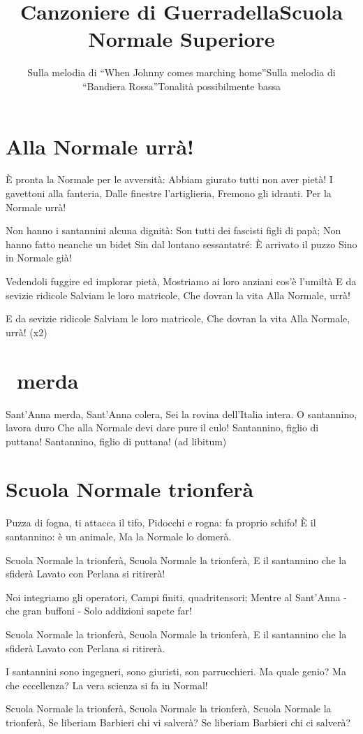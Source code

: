 \title{Canzoniere di Guerra}
\title{della}
\title{Scuola Normale Superiore}

\section{Alla Normale urrà!}
\subtitle{Sulla melodia di “When Johnny comes marching home”}
\begin{canzone}
È pronta la Normale per le avversità:
Abbiam giurato tutti non aver pietà!
I gavettoni alla fanteria,
Dalle finestre l’artiglieria,
Fremono gli idranti.
Per la Normale urrà!

Non hanno i santannini alcuna dignità:
Son tutti dei fascisti figli di papà;
Non hanno fatto neanche un bidet
Sin dal lontano sessantatré:
È arrivato il puzzo
Sino in Normale già!

Vedendoli fuggire ed implorar pietà,
Mostriamo ai loro anziani cos’è l’umiltà
E da sevizie ridicole
Salviam le loro matricole,
Che dovran la vita
Alla Normale, urrà! 

E da sevizie ridicole
Salviam le loro matricole,
Che dovran la vita
Alla Normale, urrà! (x2)
\end{canzone}

\section{\santanna\ merda}
\begin{canzone}
Sant’Anna merda, Sant’Anna colera,
Sei la rovina dell’Italia intera.
O santannino, lavora duro
Che alla Normale devi dare pure il culo!
Santannino, figlio di puttana!
Santannino, figlio di puttana! 
(ad libitum)
\end{canzone}

\section{Scuola Normale trionferà}
\subtitle{Sulla melodia di “Bandiera Rossa”}

\subtitle{Tonalità possibilmente bassa}
\begin{canzone}
Puzza di fogna, ti attacca il tifo,
Pidocchi e rogna: fa proprio schifo!
È il santannino: è un animale,
Ma la Normale lo domerà.

Scuola Normale la trionferà,
Scuola Normale la trionferà,
E il santannino che la sfiderà
Lavato con Perlana si ritirerà!

Noi integriamo gli operatori,
Campi finiti, quadritensori;
Mentre al Sant’Anna - che gran buffoni - 
Solo addizioni sapete far!

Scuola Normale la trionferà,
Scuola Normale la trionferà,
E il santannino che la sfiderà
Lavato con Perlana si ritirerà.

I santannini sono ingegneri,
sono giuristi, son parrucchieri.
Ma quale genio? Ma che eccellenza?
La vera scienza si fa in Normal!

Scuola Normale la trionferà,
Scuola Normale la trionferà,
Scuola Normale la trionferà,
Se liberiam Barbieri chi vi salverà?
Se liberiam Barbieri chi ci salverà?
\end{canzone}


